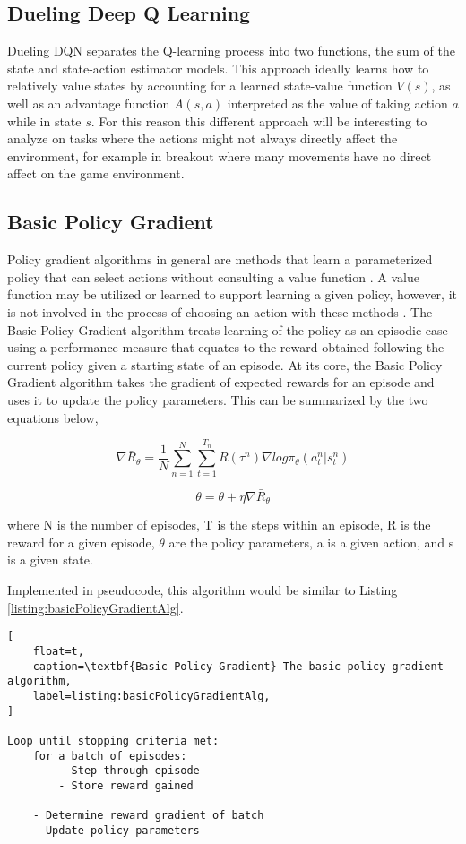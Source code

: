 \documentclass[conference]{IEEEtran}
\begin{document}
\subsection{Dueling Deep Q Learning}
Dueling DQN separates the Q-learning process into two functions, the sum of the state and state-action estimator models. This approach ideally learns how to relatively value states by accounting for a learned state-value function $V(s)$, as well as an advantage function $A(s,a)$ interpreted as the value of taking action $a$ while in state $s$. For this reason this different approach will be interesting to analyze on tasks where the actions might not always directly affect the environment, for example in breakout where many movements have no direct affect on the game environment.

\subsection{Basic Policy Gradient}
Policy gradient algorithms in general are methods that learn a parameterized policy that can select actions without consulting a value function \cite{ReinforcementLearningBook}.
A value function may be utilized or learned to support learning a given policy, however, it is not involved in the process of choosing an action with these methods \cite{ReinforcementLearningBook}.
The Basic Policy Gradient algorithm treats learning of the policy as an episodic case using a performance measure that equates to the reward obtained following the current policy given a starting state of an episode. 
At its core, the Basic Policy Gradient algorithm takes the gradient of expected rewards for an episode and uses it to update the policy parameters.
This can be summarized by the two equations below,

$$\nabla \bar{R}_{\theta} = \frac{1}{N} \sum \limits_{n=1}^N \sum \limits_{t=1}^{T_n} R(\tau^n) \nabla log\pi_{\theta}(a_{t}^n | s_{t}^n)$$

$$\theta = \theta  + \eta \nabla \bar{R}_{\theta}$$

where N is the number of episodes, T is the steps within an episode, R is the reward for a given episode, $\theta$ are the policy parameters, a is a given action, and s is a given state.

Implemented in pseudocode, this algorithm would be similar to Listing \ref{listing:basicPolicyGradientAlg}.

\begin{lstlisting}[
    float=t,
    caption=\textbf{Basic Policy Gradient} The basic policy gradient algorithm,
    label=listing:basicPolicyGradientAlg,
]

Loop until stopping criteria met:
    for a batch of episodes:
        - Step through episode
        - Store reward gained

    - Determine reward gradient of batch
    - Update policy parameters
\end{lstlisting}
\end{document}
